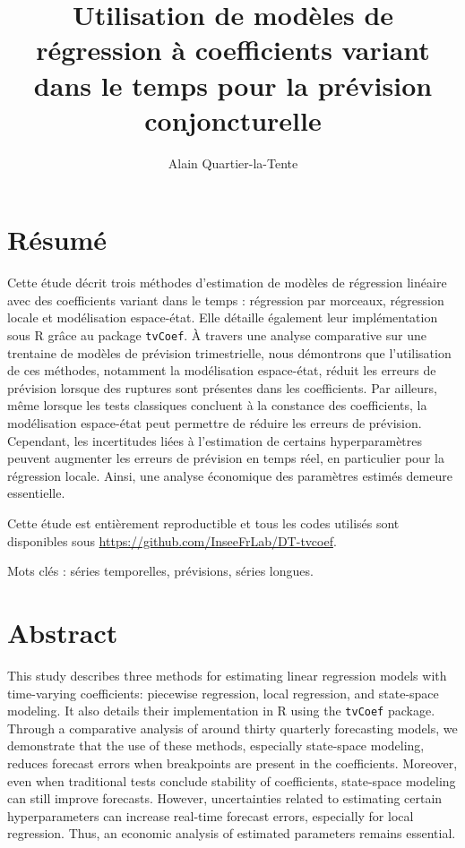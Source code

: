 \documentclass[
  a4paper,
  DIV=11,
  numbers=noendperiod,
  french]{scrartcl}
\title{Utilisation de modèles de régression à coefficients variant dans
le temps pour la prévision conjoncturelle}
\author{Alain Quartier-la-Tente}
\date{}
\newcommand\1{{\mathds 1}}
\renewcommand*\contentsname{Table des matières}
\newcommand\contentsname{Table des matières}
\theoremstyle{remark}
\begin{document}
\maketitle

\renewcommand*\contentsname{Table des matières}
{
\hypersetup{linkcolor=}
\setcounter{tocdepth}{3}
\tableofcontents
}
\newpage

\section*{Résumé}\label{ruxe9sumuxe9}

Cette étude décrit trois méthodes d'estimation de modèles de régression
linéaire avec des coefficients variant dans le temps : régression par
morceaux, régression locale et modélisation espace-état. Elle détaille
également leur implémentation sous R grâce au package \texttt{tvCoef}. À
travers une analyse comparative sur une trentaine de modèles de
prévision trimestrielle, nous démontrons que l'utilisation de ces
méthodes, notamment la modélisation espace-état, réduit les erreurs de
prévision lorsque des ruptures sont présentes dans les coefficients. Par
ailleurs, même lorsque les tests classiques concluent à la constance des
coefficients, la modélisation espace-état peut permettre de réduire les
erreurs de prévision. Cependant, les incertitudes liées à l'estimation
de certains hyperparamètres peuvent augmenter les erreurs de prévision
en temps réel, en particulier pour la régression locale. Ainsi, une
analyse économique des paramètres estimés demeure essentielle.

Cette étude est entièrement reproductible et tous les codes utilisés
sont disponibles sous \url{https://github.com/InseeFrLab/DT-tvcoef}.

Mots clés : séries temporelles, prévisions, séries longues.

\section*{Abstract}\label{abstract}

This study describes three methods for estimating linear regression
models with time-varying coefficients: piecewise regression, local
regression, and state-space modeling. It also details their
implementation in R using the \texttt{tvCoef} package. Through a
comparative analysis of around thirty quarterly forecasting models, we
demonstrate that the use of these methods, especially state-space
modeling, reduces forecast errors when breakpoints are present in the
coefficients. Moreover, even when traditional tests conclude stability
of coefficients, state-space modeling can still improve forecasts.
However, uncertainties related to estimating certain hyperparameters can
increase real-time forecast errors, especially for local regression.
Thus, an economic analysis of estimated parameters remains essential.
\end{document}
